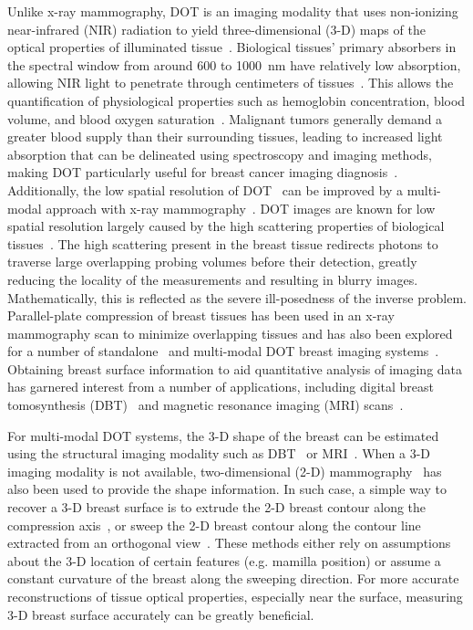 Unlike x-ray mammography, DOT is an imaging modality that uses non-ionizing near-infrared (NIR) radiation to yield three-dimensional (3-D) maps of the optical properties of illuminated tissue~\cite{Boas2001, Dehghani2009, Yamada2014, Hoshi2016}. Biological tissues' primary absorbers in the spectral window from around 600 to 1000~nm have relatively low absorption, allowing NIR light to penetrate through centimeters of tissues~\cite{Gibson2005}. This allows the quantification of physiological properties such as hemoglobin concentration, blood volume, and blood oxygen saturation~\cite{Leff2008, Boas2001}. Malignant tumors generally demand a greater blood supply than their surrounding tissues, leading to increased light absorption that can be delineated using spectroscopy and imaging methods, making DOT particularly useful for breast cancer imaging diagnosis~\cite{Wang2022, Vavadi2014, Flexman2013, Choe2009, Taroni2005}. Additionally, the low spatial resolution of DOT~\cite{Li2010} can be improved by a multi-modal approach with x-ray mammography~\cite{Zimmermann2017, Deng2015, Deng2015a, Fang2009a}. DOT images are known for low spatial resolution largely caused by the high scattering properties of biological tissues~\cite{Boas2001}. The high scattering present in the breast tissue redirects photons to traverse large overlapping probing volumes before their detection, greatly reducing the locality of the measurements and resulting in blurry images. Mathematically, this is reflected as the severe ill-posedness of the inverse problem. Parallel-plate compression of breast tissues has been used in an x-ray mammography scan to minimize overlapping tissues and has also been explored for a number of standalone~\cite{Choe2009, Culver2003} and multi-modal DOT breast imaging systems~\cite{ZhuReview2020, Fang2009a, Krishnaswamy2012}. Obtaining breast surface information to aid quantitative analysis of imaging data has garnered interest from a number of applications, including digital breast tomosynthesis (DBT)~\cite{Rodriguez2017} and magnetic resonance imaging (MRI) scans~\cite{Pallone2014, Ortiz2012}.

For multi-modal DOT systems, the 3-D shape of the breast can be estimated using the structural imaging modality such as DBT~\cite{Fang2011} or MRI~\cite{Brooksby2006}. When a 3-D imaging modality is not available, two-dimensional (2-D) mammography~\cite{Deng2015a} has also been used to provide the shape information. In such case, a simple way to recover a 3-D breast surface is to extrude the 2-D breast contour along the compression axis~\cite{Kruger2013, Kalbhen1999}, or sweep the 2-D breast contour along the contour line extracted from an orthogonal view~\cite{Kita1998}. These methods either rely on assumptions about the 3-D location of certain features (e.g. mamilla position) or assume a constant curvature of the breast along the sweeping direction. For more accurate reconstructions of tissue optical properties, especially near the surface, measuring 3-D breast surface accurately can be greatly beneficial.

